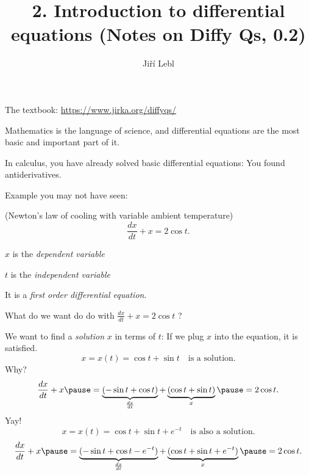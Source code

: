 \documentclass[10pt,aspectratio=169]{beamer}
\author{Ji\v{r}\'i Lebl}
\institute[OSU]{%
Oklahoma State University%
}
\title{2. Introduction to differential equations (Notes on Diffy Qs, 0.2)}
\date{}
\begin{document}
\begin{frame}
\titlepage


\begin{center}
The textbook: \url{https://www.jirka.org/diffyqs/}
\end{center}
\end{frame}

\begin{frame}
Mathematics is the language of science, and differential equations
are the most basic and important part of it.

\medskip
\pause

In calculus, you have already solved basic differential equations: You found
antiderivatives.

\medskip
\pause

Example you may not have seen:

{\small (Newton's law of cooling with variable ambient temperature)}
\[
\frac{dx}{dt} + x = 2 \cos t .
\]

\pause
$x$ is the \emph{dependent variable}

$t$ is the \emph{independent variable}

\medskip
\pause

It is a
\emph{first order differential equation}.

\end{frame}

\begin{frame}
What do we want do do with
\quad
$\displaystyle
\frac{dx}{dt} + x = 2 \cos t$ \quad ?

\medskip
\pause
We want to find a \emph{solution} $x$ in terms of $t$:
\quad
\pause
If we plug $x$ into the equation, it is satisfied.
\pause
\[
x = x(t) = \cos t + \sin t
\quad \text{is a solution.}
\]
\pause
Why?
\pause
\[
\frac{dx}{dt} + x
\pause
= 
\underbrace{(-\sin t + \cos t)}_{\frac{dx}{dt}}
+
\underbrace{(\cos t + \sin t)}_{x}
\pause
=
2\cos t .
\]
\pause
Yay!
\pause
\[
x = x(t) = \cos t + \sin t + e^{-t}
\quad \text{is also a solution.}
\]
\pause
\[
\frac{dx}{dt} + x
\pause
= 
\underbrace{(-\sin t + \cos t - e^{-t})}_{\frac{dx}{dt}} +
\underbrace{(\cos t + \sin t + e^{-t})}_{x}
\pause
= 2\cos t .
\]
\end{frame}
\end{document}
